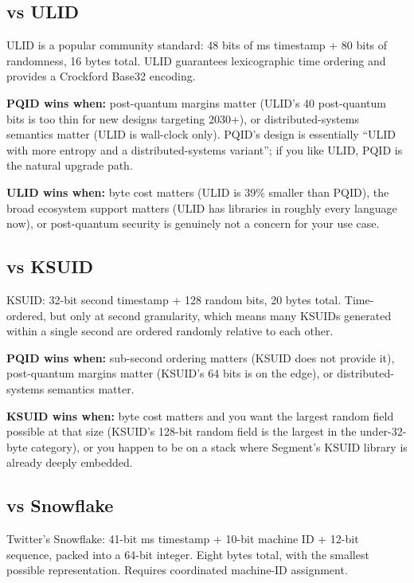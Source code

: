 \subsection{vs ULID \citep{ulid}}

ULID is a popular community standard: 48 bits of ms timestamp + 80 bits of randomness, 16 bytes total. ULID guarantees lexicographic time ordering and provides a Crockford Base32 encoding.

\textbf{PQID wins when:} post-quantum margins matter (ULID's 40 post-quantum bits is too thin for new designs targeting 2030+), or distributed-systems semantics matter (ULID is wall-clock only). PQID's design is essentially ``ULID with more entropy and a distributed-systems variant''; if you like ULID, PQID is the natural upgrade path.

\textbf{ULID wins when:} byte cost matters (ULID is 39\% smaller than PQID), the broad ecosystem support matters (ULID has libraries in roughly every language now), or post-quantum security is genuinely not a concern for your use case.

\subsection{vs KSUID \citep{ksuid}}

KSUID: 32-bit second timestamp + 128 random bits, 20 bytes total. Time-ordered, but only at second granularity, which means many KSUIDs generated within a single second are ordered randomly relative to each other.

\textbf{PQID wins when:} sub-second ordering matters (KSUID does not provide it), post-quantum margins matter (KSUID's 64 bits is on the edge), or distributed-systems semantics matter.

\textbf{KSUID wins when:} byte cost matters and you want the largest random field possible at that size (KSUID's 128-bit random field is the largest in the under-32-byte category), or you happen to be on a stack where Segment's KSUID library is already deeply embedded.

\subsection{vs Snowflake \citep{snowflake}}

Twitter's Snowflake: 41-bit ms timestamp + 10-bit machine ID + 12-bit sequence, packed into a 64-bit integer. Eight bytes total, with the smallest possible representation. Requires coordinated machine-ID assignment.

